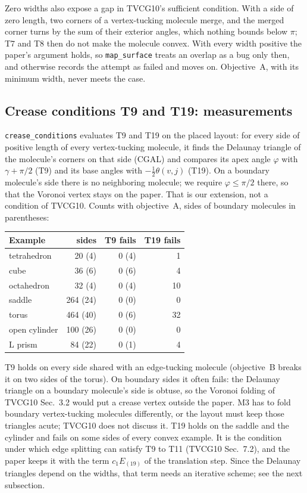 \documentclass[11pt]{article}
\theoremstyle{definition}
\begin{document}
Zero widths also expose a gap in TVCG10's sufficient condition. With a side
of zero length, two corners of a vertex-tucking molecule merge, and the
merged corner turns by the sum of their exterior angles, which nothing bounds
below $\pi$; T7 and T8 then do not make the molecule convex. With every width
positive the paper's argument holds, so \texttt{map\_surface} treats an
overlap as a bug only then, and otherwise records the attempt as failed and
moves on. Objective~A, with its minimum width, never meets the case.

\subsection{Crease conditions T9 and T19: measurements}

\texttt{crease\_conditions} evaluates T9 and T19 on the placed layout: for
every side of positive length of every vertex-tucking molecule, it finds the
Delaunay triangle of the molecule's corners on that side (CGAL) and compares
its apex angle $\varphi$ with $\gamma + \pi/2$ (T9) and its base angles with
$-\frac12\theta(v,j)$ (T19). On a boundary molecule's side there is no
neighboring molecule; we require $\varphi \le \pi/2$ there, so that the
Voronoi vertex stays on the paper. That is our extension, not a condition of
TVCG10. Counts with objective~A, sides of boundary molecules in parentheses:

\begin{center}
\small
\begin{tabular}{@{}lrrr@{}}
\toprule
Example & sides & T9 fails & T19 fails \\
\midrule
tetrahedron & 20 (4) & 0 (4) & 1 \\
cube & 36 (6) & 0 (6) & 4 \\
octahedron & 32 (4) & 0 (4) & 10 \\
saddle & 264 (24) & 0 (0) & 0 \\
torus & 464 (40) & 0 (6) & 32 \\
open cylinder & 100 (26) & 0 (0) & 0 \\
L prism & 84 (22) & 0 (1) & 4 \\
\bottomrule
\end{tabular}
\end{center}

T9 holds on every side shared with an edge-tucking molecule (objective~B
breaks it on two sides of the torus). On boundary sides it often fails: the
Delaunay triangle on a boundary molecule's side is obtuse, so the Voronoi
folding of TVCG10 Sec.~3.2 would put a crease vertex outside the paper. M3
has to fold boundary vertex-tucking molecules differently, or the layout
must keep those triangles acute; TVCG10 does not discuss it. T19 holds on
the saddle and the cylinder and fails on some sides of every convex example.
It is the condition under which edge splitting can satisfy T9 to T11
(TVCG10 Sec.~7.2), and the paper keeps it with the term $c_1E_{(19)}$ of the
translation step. Since the Delaunay triangles depend on the widths, that
term needs an iterative scheme; see the next subsection.
\end{document}

